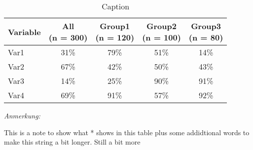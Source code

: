 \documentclass[
]{article}
\begin{document}
\begin{table}[!h]

\caption{\label{tab:unnamed-chunk-2}Caption}
\centering
\begin{threeparttable}
\begin{tabular}[t]{lcccc}
\toprule
Variable & \makecell[c]{All\\(n = 300)} & \makecell[c]{Group1\\(n = 120)} & \makecell[c]{Group2\\(n = 100)} & \makecell[c]{Group3\\(n = 80)}\\
\midrule
Var1 & 31\% & 79\% & 51\% & 14\%\\
Var2 & 67\% & 42\% & 50\% & 43\%\\
Var3 & 14\% & 25\% & 90\% & 91\%\\
Var4 & 69\% & 91\% & 57\% & 92\%\\
\bottomrule
\end{tabular}
\begin{tablenotes}
\item \textit{Anmerkung:} 
\item * This is a note to show what * shows in this table plus some addidtional words to make this string a bit longer. Still a bit more
\end{tablenotes}
\end{threeparttable}
\end{table}
\end{document}
